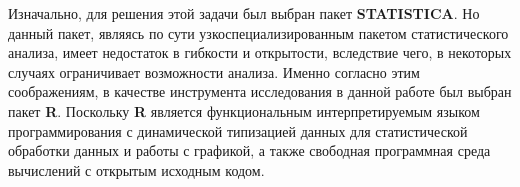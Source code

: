 Изначально, для решения этой задачи был выбран пакет \textbf{STATISTICA}. Но данный пакет, являясь по сути узкоспециализированным пакетом статистического анализа, имеет недостаток в гибкости и открытости, вследствие чего, в некоторых случаях ограничивает возможности анализа. Именно согласно этим соображениям, в качестве инструмента исследования в данной работе был выбран пакет \textbf{R}. Поскольку \textbf{R} является функциональным интерпретируемым языком программирования с динамической типизацией данных для статистической обработки данных и работы с графикой, а также свободная программная среда вычислений с открытым исходным кодом.

